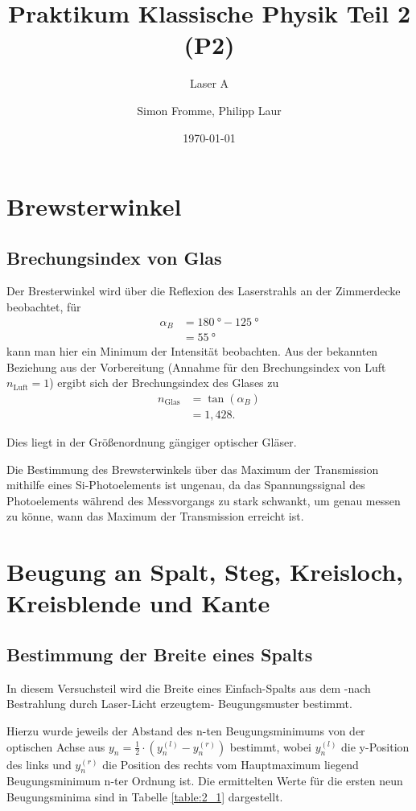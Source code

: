 \documentclass[ngerman, parskip*]{scrartcl}
\title{Praktikum Klassische Physik Teil 2 (P2)}
\subtitle{Laser A}
\author{Simon Fromme, Philipp Laur}
\date{\today}
\begin{document}
\maketitle
\tableofcontents
\newpage

\section{Brewsterwinkel}

\subsection{Brechungsindex von Glas}

Der Bresterwinkel wird über die Reflexion des Laserstrahls an der Zimmerdecke beobachtet, für 
\begin{align*}
  \alpha_B &=  \SI{180}{\degree} - \SI{125}{\degree} \\
  &=  \SI{55}{\degree}
\end{align*} 
kann man hier ein Minimum der Intensität beobachten. Aus der bekannten Beziehung aus der Vorbereitung (Annahme für den Brechungsindex von Luft $n_{\textrm{Luft}} = 1$) ergibt sich der Brechungsindex des Glases zu
\begin{align*}
  n_{\textrm{Glas}} &= \tan(\alpha_B) \\
  &= 1,428.
\end{align*}

Dies liegt in der Größenordnung gängiger optischer Gläser.

Die Bestimmung des Brewsterwinkels über das Maximum der Transmission mithilfe eines Si-Photoelements ist ungenau, da das Spannungssignal des Photoelements während des Messvorgangs zu stark schwankt, um genau messen zu könne, wann das Maximum der Transmission erreicht ist.


\section{Beugung an Spalt, Steg, Kreisloch, Kreisblende und Kante}

\subsection{Bestimmung der Breite eines Spalts}

In diesem Versuchsteil wird die Breite eines Einfach-Spalts aus dem -nach Bestrahlung durch Laser-Licht erzeugtem- Beugungsmuster bestimmt. 

Hierzu wurde jeweils der Abstand des n-ten Beugungsminimums von der optischen Achse aus $y_n = \frac{1}{2}\cdot (y_n^{(l)} - y_n^{(r)})$ bestimmt, wobei $y_n^{(l)}$ die y-Position des links und $y_n^{(r)}$ die Position des rechts vom Hauptmaximum liegend Beugungsminimum n-ter Ordnung ist. Die ermittelten Werte für die ersten neun Beugungsminima sind in Tabelle \ref{table:2_1} dargestellt.
\end{document}
